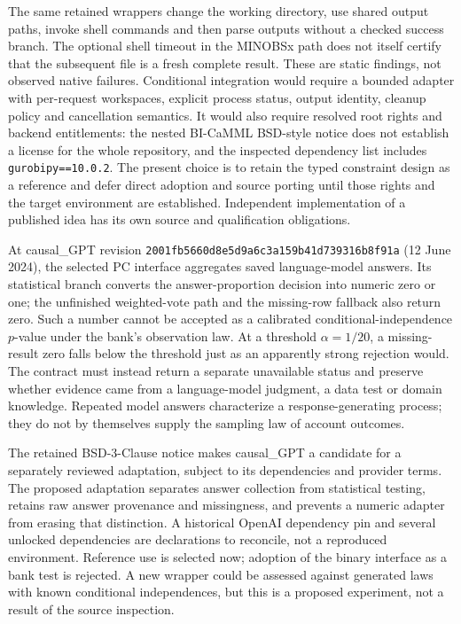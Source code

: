 The same retained wrappers change the working directory, use shared output
paths, invoke shell commands and then parse outputs without a checked success
branch. The optional shell timeout in the MINOBSx path does not itself certify
that the subsequent file is a fresh complete result. These are static findings,
not observed native failures. Conditional integration would require a bounded
adapter with per-request workspaces, explicit process status, output identity,
cleanup policy and cancellation semantics. It would also require resolved root
rights and backend entitlements: the nested BI-CaMML BSD-style notice does not
establish a license for the whole repository, and the inspected dependency list
includes \texttt{gurobipy==10.0.2}. The present choice is to retain the typed
constraint design as a reference and defer direct adoption and source porting
until those rights and the target environment are established. Independent
implementation of a published idea has its own source and qualification
obligations.\citep{exec14_iid_cd,exec25_agents_choice}

At causal\_GPT revision
\texttt{2001fb5660d8e5d9a6c3}\allowbreak\texttt{a159b41d739316b8f91a}
(12 June 2024), the selected PC interface aggregates saved language-model
answers. Its statistical branch converts the answer-proportion decision into
numeric zero or one; the unfinished weighted-vote path and the missing-row
fallback also return zero. Such a number cannot be accepted as a calibrated
conditional-independence $p$-value under the bank's observation law. At a
threshold $\alpha=1/20$, a missing-result zero falls below the threshold just as
an apparently strong rejection would. The contract must instead return a
separate unavailable status and preserve whether evidence came from a
language-model judgment, a data test or domain knowledge. Repeated model
answers characterize a response-generating process; they do not by themselves
supply the sampling law of account outcomes.\citep{exec14_iid_gpt,exec25_agents_choice}

The retained BSD-3-Clause notice makes causal\_GPT a candidate for a separately
reviewed adaptation, subject to its dependencies and provider terms. The
proposed adaptation separates answer collection from statistical testing,
retains raw answer provenance and missingness, and prevents a numeric adapter
from erasing that distinction. A historical OpenAI dependency pin and several
unlocked dependencies are declarations to reconcile, not a reproduced
environment. Reference use is selected now; adoption of the binary interface
as a bank test is rejected. A new wrapper could be assessed against generated
laws with known conditional independences, but this is a proposed experiment,
not a result of the source inspection.\citep{exec14_iid_gpt,exec25_agents_choice}

